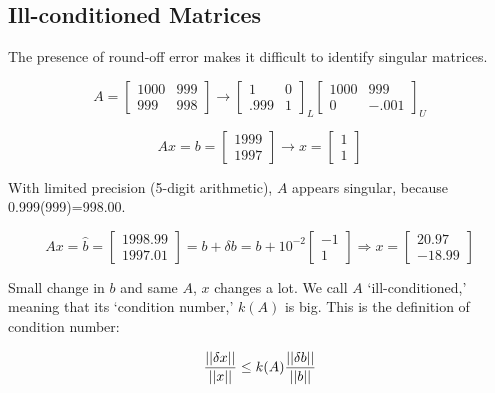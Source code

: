
\subsection{Ill-conditioned Matrices}

The presence of round-off error makes it difficult to identify singular matrices.

\[
	A =
	\begin{bmatrix}
		1000 & 999 \\ 999 & 998		
	\end{bmatrix}	
	\rightarrow
	\begin{bmatrix}
		1 & 0 \\ .999 & 1
	\end{bmatrix}_L
	\begin{bmatrix}
		1000 & 999 \\
		0 & -.001
	\end{bmatrix}_U
\]


\[
	Ax = b = \begin{bmatrix} 1999 \\ 1997 \end{bmatrix}
	\rightarrow
	x = \begin{bmatrix} 1 \\ 1 \end{bmatrix}
\]

With limited precision (5-digit arithmetic), $A$ appears singular, because 0.999(999)=998.00.

\[
	Ax = \hat{b} = \begin{bmatrix} 1998.99 \\ 1997.01 \end{bmatrix} =
	b + \delta b = b + 10^{-2} \begin{bmatrix} -1 \\ 1 \end{bmatrix}
	\Rightarrow
	x = \begin{bmatrix} 20.97 \\ -18.99 \end{bmatrix}
\]

Small change in $b$ and same $A$, $x$ changes a lot. We call $A$ `ill-conditioned,' meaning that its `condition number,' $k(A)$ is big. This is the definition of condition number:

\[
	{\left|\left|\delta x\right|\right| \over \left|\left|x\right|\right|} \leq k(A) {\left|\left|\delta b\right|\right| \over \left|\left|b\right|\right|}
\]

